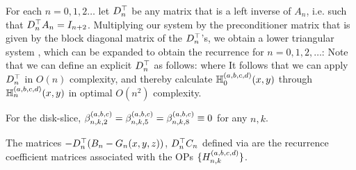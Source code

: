 For each $n = 0,1,2\dots$ let $D^\top_n$ be any matrix that is a left inverse of $A_n$, i.e. such that $D^\top_n A_n = I_{n+2}$. Multiplying our system by the preconditioner matrix that is given by the block diagonal matrix of the $D^\top_n$'s, we obtain a lower triangular system \cite[p.78]{dunkl2014orthogonal}, which can be expanded to obtain the recurrence for $n = 0,1,2,\dots$:
Note that we can define an explicit $D^\top_n$ as follows:
 where
It follows that we can apply $D^\top_n$ in $O(n)$ complexity, and thereby calculate $\mathbb{H}^{(a,b,c,d)}_{0}(x,y)$  through $\mathbb{H}^{(a,b,c,d)}_{n}(x,y)$ in optimal $O(n^2)$ complexity.

For the disk-slice, $\beta^{(a,b,c)}_{n,k,2} = \beta^{(a,b,c)}_{n,k,5} = \beta^{(a,b,c)}_{n,k,8} \equiv 0$ for any $n, k$.

\begin{definition}\label{def:sc:clenshawmats}
	The matrices $-D^\top_n (B_n-G_n(x,y,z))$, $D^\top_n C_n$ defined via  are the recurrence coefficient matrices associated with the OPs $\{H_{n,k}^{(a,b,c,d)}\}$.
\end{definition}

